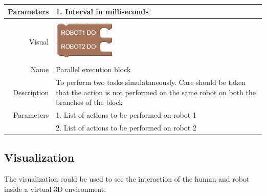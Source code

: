 \begin{longtable}[H]{|r|p{12cm}|}
                             Parameters & 1. Interval in milliseconds \\
    \hline
    {} & {} \\
                             Visual & \parbox[c]{1em}{\includegraphics[width=3cm]{../thesis/assets/blocks/parallel.png}} \\
                             Name   & Parallel execution block \\
                             Description & To perform two tasks simulataneously. Care should be taken that the action is not performed on the same robot on both the branches of the block \\
                             Parameters & 1. List of actions to be performed on robot 1 \\
                             {}         & 2. List of actions to be performed on robot 2 \\

    \hline
\end{longtable}
\subsection*{Visualization} The visualization could be used to see the interaction of the human and robot inside a virtual 3D environment.
